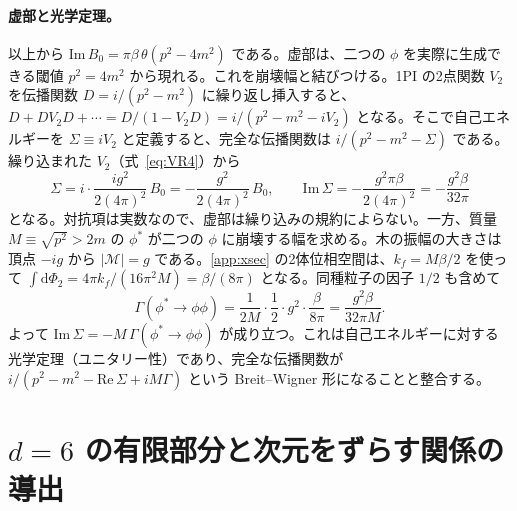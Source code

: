 \documentclass[a4paper,10pt]{ltjsarticle}
\newcommand{\dd}{\mathrm{d}}
\begin{document}
\paragraph{虚部と光学定理。}以上から $\mathrm{Im}\,B_0=\pi\beta\,\theta(p^2-4m^2)$ である。虚部は、二つの $\phi$ を実際に生成できる閾値 $p^2=4m^2$ から現れる。これを崩壊幅と結びつける。1PI の2点関数 $V_2$ を伝播関数 $D=i/(p^2-m^2)$ に繰り返し挿入すると、$D+DV_2D+\cdots=D/(1-V_2D)=i/(p^2-m^2-iV_2)$ となる。そこで自己エネルギーを $\Sigma\equiv iV_2$ と定義すると、完全な伝播関数は $i/(p^2-m^2-\Sigma)$ である。繰り込まれた $V_2$（式~\eqref{eq:VR4}）から
\begin{equation*}
\Sigma=i\cdot\frac{ig^2}{2(4\pi)^2}\,B_0=-\frac{g^2}{2(4\pi)^2}\,B_0,\qquad
\mathrm{Im}\,\Sigma=-\frac{g^2\pi\beta}{2(4\pi)^2}=-\frac{g^2\beta}{32\pi}
\end{equation*}
となる。対抗項は実数なので、虚部は繰り込みの規約によらない。一方、質量 $M\equiv\sqrt{p^2}>2m$ の $\phi^*$ が二つの $\phi$ に崩壊する幅を求める。木の振幅の大きさは頂点 $-ig$ から $|\mathcal{M}|=g$ である。\ref{app:xsec} の2体位相空間は、$k_f=M\beta/2$ を使って $\int\dd\Phi_2=4\pi k_f/(16\pi^2M)=\beta/(8\pi)$ となる。同種粒子の因子 $1/2$ も含めて
\begin{equation*}
\Gamma(\phi^*\to\phi\phi)=\frac{1}{2M}\cdot\frac12\cdot g^2\cdot\frac{\beta}{8\pi}=\frac{g^2\beta}{32\pi M}.
\end{equation*}
よって $\mathrm{Im}\,\Sigma=-M\,\Gamma(\phi^*\to\phi\phi)$ が成り立つ。これは自己エネルギーに対する光学定理（ユニタリー性）であり、完全な伝播関数が $i/(p^2-m^2-\mathrm{Re}\,\Sigma+iM\Gamma)$ という Breit--Wigner 形になることと整合する。

\section{$d=6$ の有限部分と次元をずらす関係の導出}\label{app:d6}
\end{document}
